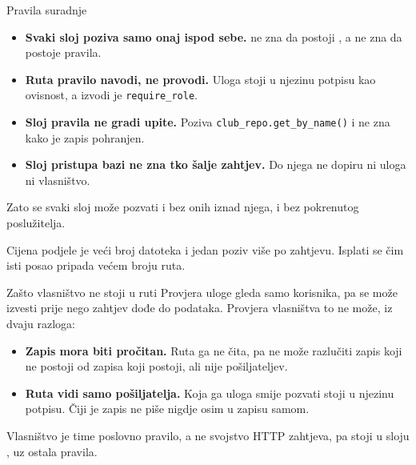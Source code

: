 \begin{frame}{Pravila suradnje}
\begin{itemize}
  \itemsep0.6em
  \item \textbf{Svaki sloj poziva samo onaj ispod sebe.}  ne zna da postoji , a  ne zna da postoje pravila.
  \item \textbf{Ruta pravilo navodi, ne provodi.} Uloga stoji u njezinu potpisu kao ovisnost, a izvodi je \texttt{require\_role}.
  \item \textbf{Sloj pravila ne gradi upite.} Poziva \texttt{club\_repo.get\_by\_name()} i ne zna kako je zapis pohranjen.
  \item \textbf{Sloj pristupa bazi ne zna tko šalje zahtjev.} Do njega ne dopiru ni uloga ni vlasništvo.
\end{itemize}

\vspace{0.9em}
Zato se svaki sloj može pozvati i bez onih iznad njega,  i bez pokrenutog poslužitelja.

\vspace{0.5em}
Cijena podjele je veći broj datoteka i jedan poziv više po zahtjevu. Isplati se čim isti posao pripada većem broju ruta.
\end{frame}


\begin{frame}{Zašto vlasništvo ne stoji u ruti}
Provjera uloge gleda samo korisnika, pa se može izvesti prije nego zahtjev dođe do podataka. Provjera vlasništva to ne može, iz dvaju razloga:

\begin{itemize}
  \item \textbf{Zapis mora biti pročitan.} Ruta ga ne čita, pa ne može razlučiti zapis koji ne postoji od zapisa koji postoji, ali nije pošiljateljev.
  \item \textbf{Ruta vidi samo pošiljatelja.} Koja ga uloga smije pozvati stoji u njezinu potpisu. Čiji je zapis ne piše nigdje osim u zapisu samom.
\end{itemize}

\vspace{0.5em}
Vlasništvo je time poslovno pravilo, a ne svojstvo HTTP zahtjeva, pa stoji u sloju , uz ostala pravila.
\end{frame}

